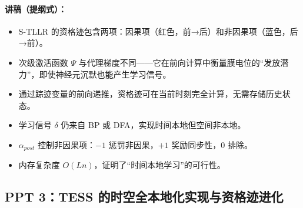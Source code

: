 \documentclass[journal,12pt,onecolumn]{IEEEtran}
\begin{document}
\paragraph{\textbf{讲稿（提纲式）：}}
\begin{itemize}
    \item S-TLLR 的资格迹包含两项：因果项（红色，前→后）和非因果项（蓝色，后→前）。
    \item 次级激活函数 \(\Psi\) 与代理梯度不同——它在前向计算中衡量膜电位的“发放潜力”，即使神经元沉默也能产生学习信号。
    \item 通过踪迹变量的前向递推，资格迹可在当前时刻完全计算，无需存储历史状态。
    \item 学习信号 \(\delta\) 仍来自 BP 或 DFA，实现时间本地但空间非本地。
    \item \(\alpha_{post}\) 控制非因果项：\(-1\) 惩罚非因果，\(+1\) 奖励同步性，\(0\) 排除。
    \item 内存复杂度 \(O(Ln)\)，证明了“时间本地学习”的可行性。
\end{itemize}

\subsection*{PPT 3：TESS 的时空全本地化实现与资格迹进化}
\end{document}

